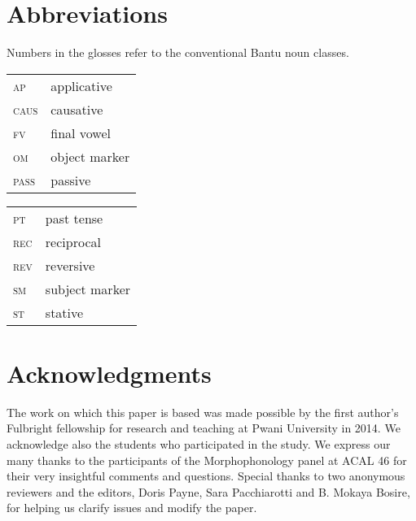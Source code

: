 \documentclass[output=paper]{langsci/langscibook}
\begin{document}
\section*{Abbreviations} 

Numbers in the glosses refer to the conventional Bantu noun classes.\\

\begin{tabularx}{.45\textwidth}{lX}
\textsc{ap} & applicative  \\
\textsc{caus} &  causative  \\ 
\textsc{fv} &  final vowel \\
\textsc{om} & object marker \\ 
\textsc{pass} & passive  \\
\end{tabularx}
\begin{tabularx}{.45\textwidth}{lX}
\textsc{pt} & past tense \\
\textsc{rec} & reciprocal  \\
\textsc{rev} & reversive \\ 
\textsc{sm} & subject marker \\
\textsc{st} & stative \\
\end{tabularx}       

\section*{Acknowledgments }

The work on which this paper is based was made possible by the first author’s Fulbright fellowship for research and teaching at Pwani University in 2014. We acknowledge also the students who participated in the study. We express our many thanks to the participants of the Morphophonology panel at ACAL 46 for their very insightful comments and questions. Special thanks to two anonymous reviewers and the editors, Doris Payne, Sara Pacchiarotti and B. Mokaya Bosire, for helping us clarify issues and modify the paper. 

\printbibliography[heading=subbibliography,notkeyword=this]
\end{document}
